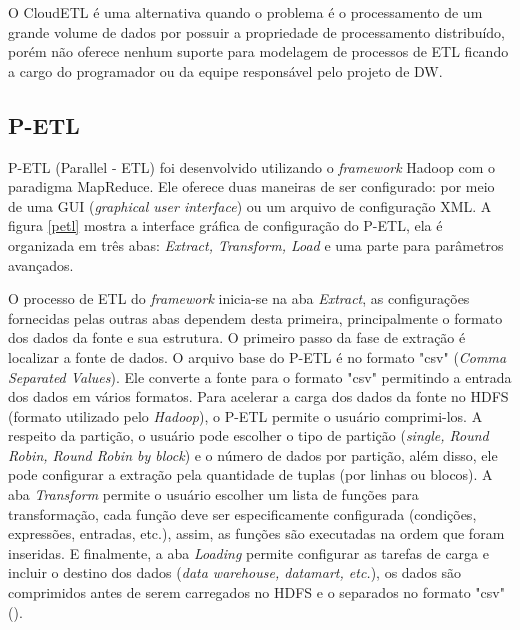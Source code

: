 O CloudETL é uma alternativa quando o problema é o processamento de um grande volume de dados por possuir a propriedade de processamento distribuído, porém não oferece nenhum suporte para modelagem de processos de ETL ficando a cargo do programador ou da equipe responsável pelo projeto de DW. 


\subsection{P-ETL}

P-ETL (Parallel - ETL) foi desenvolvido utilizando o \textit{framework} Hadoop com o paradigma MapReduce. Ele oferece duas maneiras de ser configurado: por meio de uma GUI (\textit{graphical user interface}) ou um arquivo de configuração XML. A figura \ref{petl} mostra a interface gráfica de configuração do P-ETL, ela é organizada em três abas: \textit{Extract, Transform, Load} e uma parte para parâmetros avançados. 

O processo de ETL do \textit{framework} inicia-se na aba \textit{Extract}, as configurações fornecidas pelas outras abas dependem desta primeira, principalmente o formato dos dados da fonte e sua estrutura. O primeiro passo da fase de extração é localizar a fonte de dados.  O arquivo base do P-ETL é no formato "csv" (\textit{Comma Separated Values}). Ele converte a fonte para o formato "csv" permitindo a entrada dos dados em vários formatos. Para acelerar a carga dos dados da fonte no HDFS (formato utilizado pelo \textit{Hadoop}), o P-ETL permite o usuário comprimi-los. A respeito da partição, o usuário pode escolher o tipo de partição (\textit{single, Round Robin, Round Robin by block}) e o número de dados por partição, além disso, ele pode configurar a extração pela quantidade de tuplas (por linhas ou blocos). A aba \textit{Transform} permite o usuário escolher um lista de funções para transformação, cada função deve ser especificamente configurada (condições, expressões, entradas, etc.), assim, as funções são executadas na ordem que foram inseridas. E finalmente, a aba \textit{Loading} permite configurar as tarefas de carga e incluir o destino dos dados (\textit{data warehouse, datamart, etc.}), os dados são comprimidos antes de serem carregados no HDFS e o separados no formato "csv" (\cite{bala:2014}).

